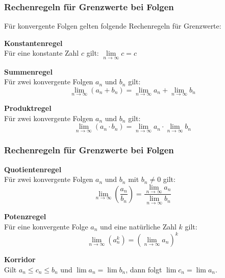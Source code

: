 \documentclass{beamer}
\begin{document}
  \begin{frame}
    \frametitle{Rechenregeln für Grenzwerte bei Folgen}
  
    Für konvergente Folgen gelten folgende Rechenregeln für Grenzwerte:
  
  
    \textbf{Konstantenregel} \\
    Für eine konstante Zahl $c$ gilt: $\lim\limits_{n \to \infty} c = c$
   
    \vspace{0.3em}

    \textbf{Summenregel} \\
    Für zwei konvergente Folgen $a_n$ und $b_n$ gilt: $$\lim\limits_{n \to \infty} (a_n + b_n) = \lim\limits_{n \to \infty} a_n + \lim\limits_{n \to \infty} b_n$$
 
    \vspace{0.3em}
  
    \textbf{Produktregel} \\
    Für zwei konvergente Folgen $a_n$ und $b_n$ gilt: $$\lim\limits_{n \to \infty} (a_n \cdot b_n) = \lim\limits_{n \to \infty} a_n \cdot \lim\limits_{n \to \infty} b_n$$

\end{frame}
  
\begin{frame}
  \frametitle{Rechenregeln für Grenzwerte bei Folgen}
  
    \textbf{Quotientenregel} \\
    Für zwei konvergente Folgen $a_n$ und $b_n$ mit $b_n \neq 0$ gilt: $$\lim\limits_{n \to \infty} \left(\frac{a_n}{b_n}\right) = \frac{\lim\limits_{n \to \infty} a_n}{\lim\limits_{n \to \infty} b_n}$$

    \vspace{0.3em}

    \textbf{Potenzregel} \\
    Für eine konvergente Folge $a_n$ und eine natürliche Zahl $k$ gilt: $$\lim\limits_{n \to \infty} (a_n^k) = \left(\lim\limits_{n \to \infty} a_n\right)^k$$

    \vspace{0.3em}
    \textbf{Korridor}\\
    Gilt $a_n\leq c_n \leq b_n$ und $\lim a_n = \lim b_n$, dann folgt $\lim c_n = \lim a_n$.
  \end{frame}
\end{document}
